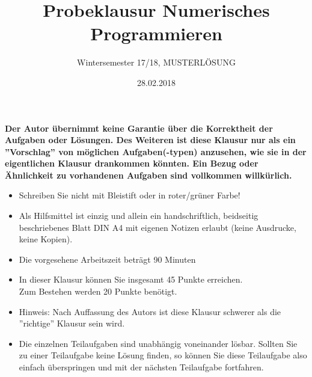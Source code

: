 \documentclass{scrartcl}
\begin{document}
\title{Probeklausur Numerisches Programmieren}
\subtitle{Wintersemester 17/18, MUSTERLÖSUNG}
\author{\npauthor{}}
\date{28.02.2018}
\maketitle

\textbf{Der Autor übernimmt keine Garantie über die Korrektheit der Aufgaben oder Lösungen. \n Des Weiteren ist diese Klausur nur als ein ''Vorschlag'' von möglichen Aufgaben(-typen) anzusehen, wie sie in der eigentlichen Klausur drankommen könnten. Ein Bezug oder Ähnlichkeit zu vorhandenen Aufgaben sind vollkommen willkürlich.}
\sbreak

\begin{itemize}
	\item Schreiben Sie nicht mit Bleistift oder in roter/grüner Farbe!
	\item Als Hilfsmittel ist einzig und allein ein handschriftlich, beidseitig beschriebenes Blatt DIN A4 mit eigenen Notizen erlaubt (keine Ausdrucke, keine Kopien).
	\item Die vorgesehene Arbeitszeit beträgt 90 Minuten
	\item In dieser Klausur können Sie insgesamt 45 Punkte erreichen. \\Zum Bestehen werden 20 Punkte benötigt.
	\item Hinweis: Nach Auffassung des Autors ist diese Klausur schwerer als die ''richtige'' Klausur sein wird.
	\item Die einzelnen Teilaufgaben sind unabhängig voneinander lösbar.
	Sollten Sie zu einer Teilaufgabe keine Lösung finden, so können Sie diese Teilaufgabe also
	einfach überspringen und mit der nächsten Teilaufgabe fortfahren.
\end{itemize}
\end{document}
